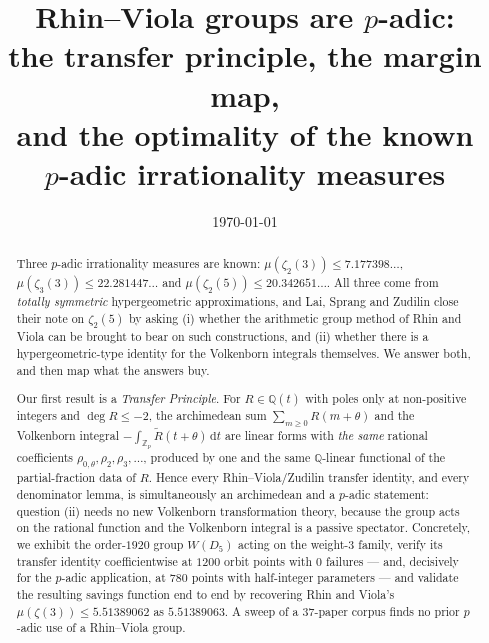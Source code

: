 \documentclass[11pt,reqno]{amsart}
\theoremstyle{plain}
\theoremstyle{definition}
\numberwithin{equation}{section}
\newcommand{\ZZ}{\mathbb{Z}}
\newcommand{\QQ}{\mathbb{Q}}
\newcommand{\Zp}{\ZZ_p}
\newcommand{\dd}{\mathrm{d}}
\begin{document}
\title[Rhin--Viola groups are $p$-adic]
{Rhin--Viola groups are $p$-adic:\\
the transfer principle, the margin map,\\
and the optimality of the known\\ $p$-adic irrationality measures}

\author{}
\address{}
\email{}

\date{\today}


\begin{abstract}
Three $p$-adic irrationality measures are known:
$\mu(\zeta_2(3))\le 7.177398\dots$, $\mu(\zeta_3(3))\le 22.281447\dots$ and
$\mu(\zeta_2(5))\le 20.342651\dots$. All three come from \emph{totally symmetric}
hypergeometric approximations, and Lai, Sprang and Zudilin close their note on
$\zeta_2(5)$ by asking (i) whether the arithmetic group method of Rhin and Viola can be
brought to bear on such constructions, and (ii) whether there is a hypergeometric-type
identity for the Volkenborn integrals themselves. We answer both, and then map what the
answers buy.

Our first result is a \emph{Transfer Principle}. For $R\in\QQ(t)$ with poles only at
non-positive integers and $\deg R\le-2$, the archimedean sum $\sum_{m\ge0}R(m+\theta)$ and
the Volkenborn integral $-\int_{\Zp}\widetilde R(t+\theta)\,\dd t$ are linear forms with
\emph{the same} rational coefficients $\rho_{0,\theta},\rho_2,\rho_3,\dots$, produced by one
and the same $\QQ$-linear functional of the partial-fraction data of $R$. Hence every
Rhin--Viola/Zudilin transfer identity, and every denominator lemma, is simultaneously an
archimedean and a $p$-adic statement: question (ii) needs no new Volkenborn transformation
theory, because the group acts on the rational function and the Volkenborn integral is a
passive spectator. Concretely, we exhibit the order-$1920$ group $W(D_5)$ acting on the
weight-$3$ family, verify its transfer identity coefficientwise at $1200$ orbit points with
$0$ failures --- and, decisively for the $p$-adic application, at $780$ points with
half-integer parameters --- and validate the resulting savings function end to end by
recovering Rhin and Viola's $\mu(\zeta(3))\le5.51389062$ as $5.51389063$. A sweep of a
$37$-paper corpus finds no prior $p$-adic use of a Rhin--Viola group.


\end{abstract}
\end{document}
